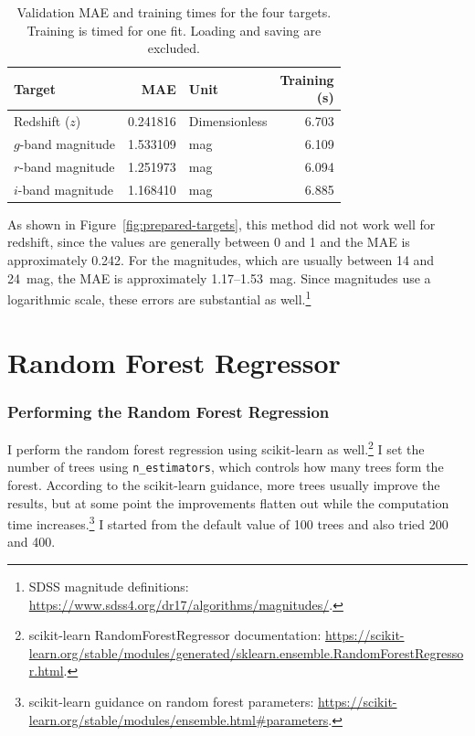 \documentclass[12pt,a4paper]{article}
\begin{document}
\begin{table}[htbp]
\centering
\small
\setlength{\tabcolsep}{3pt}
\caption{Validation MAE and training times for the four targets. Training is timed for one fit. Loading and saving are excluded.}
\begin{tabular}{lrlr}
\toprule
Target & MAE & Unit & \shortstack{Training\\(s)} \\
\midrule
Redshift ($z$) & 0.241816 & Dimensionless & 6.703 \\
$g$-band magnitude & 1.533109 & mag & 6.109 \\
$r$-band magnitude & 1.251973 & mag & 6.094 \\
$i$-band magnitude & 1.168410 & mag & 6.885 \\
\bottomrule
\end{tabular}
\end{table}

As shown in Figure~\ref{fig:prepared-targets}, this method did not work well for redshift, since the values are generally between 0 and 1 and the MAE is approximately 0.242. For the magnitudes, which are usually between 14 and 24~mag, the MAE is approximately 1.17--1.53~mag. Since magnitudes use a logarithmic scale, these errors are substantial as well.\footnote{SDSS magnitude definitions: \url{https://www.sdss4.org/dr17/algorithms/magnitudes/}.}

\clearpage
\section{Random Forest Regressor}

\subsubsection{Performing the Random Forest Regression}

I perform the random forest regression using scikit-learn as well.\footnote{\raggedright scikit-learn RandomForestRegressor documentation: \url{https://scikit-learn.org/stable/modules/generated/sklearn.ensemble.RandomForestRegressor.html}.} I set the number of trees using \texttt{n\_estimators}, which controls how many trees form the forest. According to the scikit-learn guidance, more trees usually improve the results, but at some point the improvements flatten out while the computation time increases.\footnote{\raggedright scikit-learn guidance on random forest parameters: \url{https://scikit-learn.org/stable/modules/ensemble.html\#parameters}.} I started from the default value of 100 trees and also tried 200 and 400.
\end{document}

